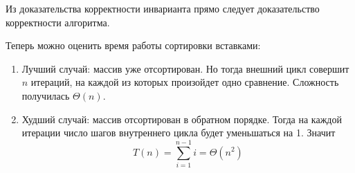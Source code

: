 \documentclass[../book.tex]{subfiles}
\begin{document}
	Из доказательства корректности инварианта прямо следует доказательство корректности алгоритма.
	
	Теперь можно оценить время работы сортировки вставками:
	\begin{enumerate}
		\item Лучший случай: массив уже отсортирован. Но тогда внешний цикл совершит $n$ итераций, на каждой из которых произойдет одно сравнение. Сложность получилась $\Theta(n)$.
		
		\item Худший случай: массив отсортирован в обратном порядке. Тогда на каждой итерации число шагов внутреннего цикла будет уменьшаться на 1. Значит 
		\[
		T(n) = \sum_{i = 1}^{n - 1}i = \Theta(n^2)
		\]
	\end{enumerate}
	
	\pagebreak
\end{document}
